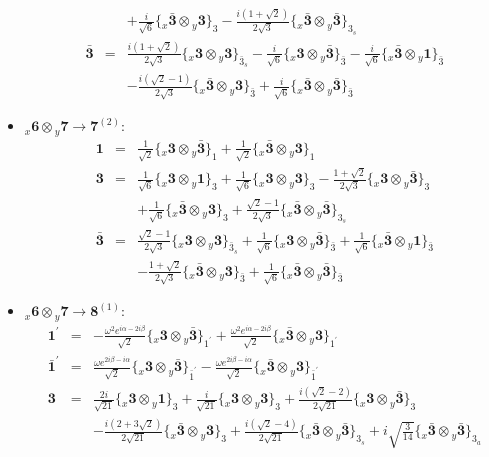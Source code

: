 \documentclass[english]{article}
\newcommand{\rep}[1]{\mathbf{#1}}
\newcommand{\repx}[2]{{}_{#2}\mathbf{#1}}
\newcommand{\subcg}[3]{\big\{ \repx{#1}{x}\otimes\repx{#2}{y}\big\}^{}_{#3}}
\begin{document}
\begin{itemize}
\begin{eqnarray*}
 & & +\frac{i}{\sqrt{6}}\subcg{\bar{3}}{3}{3}-\frac{i \left(1+\sqrt{2}\right)}{2 \sqrt{3}}\subcg{\bar{3}}{\bar{3}}{3_{s}}
\\
\rep{\bar{3}} &=& \frac{i \left(1+\sqrt{2}\right)}{2 \sqrt{3}}\subcg{3}{3}{\bar{3}_{s}}-\frac{i}{\sqrt{6}}\subcg{3}{\bar{3}}{\bar{3}}-\frac{i}{\sqrt{6}}\subcg{\bar{3}}{1}{\bar{3}} \\ 
 & & -\frac{i \left(\sqrt{2}-1\right)}{2 \sqrt{3}}\subcg{\bar{3}}{3}{\bar{3}}+\frac{i}{\sqrt{6}}\subcg{\bar{3}}{\bar{3}}{\bar{3}}
\end{eqnarray*}
\item $\repx{6}{x}\otimes\repx{7}{y}\to\rep{7}^{(2)}$:
\begin{eqnarray*}
\rep{1} &=& \frac{1}{\sqrt{2}}\subcg{3}{\bar{3}}{1}+\frac{1}{\sqrt{2}}\subcg{\bar{3}}{3}{1}
\\
\rep{3} &=& \frac{1}{\sqrt{6}}\subcg{3}{1}{3}+\frac{1}{\sqrt{6}}\subcg{3}{3}{3}-\frac{1+\sqrt{2}}{2 \sqrt{3}}\subcg{3}{\bar{3}}{3} \\ 
 & & +\frac{1}{\sqrt{6}}\subcg{\bar{3}}{3}{3}+\frac{\sqrt{2}-1}{2 \sqrt{3}}\subcg{\bar{3}}{\bar{3}}{3_{s}}
\\
\rep{\bar{3}} &=& \frac{\sqrt{2}-1}{2 \sqrt{3}}\subcg{3}{3}{\bar{3}_{s}}+\frac{1}{\sqrt{6}}\subcg{3}{\bar{3}}{\bar{3}}+\frac{1}{\sqrt{6}}\subcg{\bar{3}}{1}{\bar{3}} \\ 
 & & -\frac{1+\sqrt{2}}{2 \sqrt{3}}\subcg{\bar{3}}{3}{\bar{3}}+\frac{1}{\sqrt{6}}\subcg{\bar{3}}{\bar{3}}{\bar{3}}
\end{eqnarray*}
\item $\repx{6}{x}\otimes\repx{7}{y}\to\rep{8}^{(1)}$:
\begin{eqnarray*}
\rep{1^{\prime}} &=& -\frac{\omega ^2 e^{i \alpha -2 i \beta }}{\sqrt{2}}\subcg{3}{\bar{3}}{1^{\prime}}+\frac{\omega ^2 e^{i \alpha -2 i \beta }}{\sqrt{2}}\subcg{\bar{3}}{3}{1^{\prime}}
\\
\rep{\bar{1}^{\prime}} &=& \frac{\omega  e^{2 i \beta -i \alpha }}{\sqrt{2}}\subcg{3}{\bar{3}}{\bar{1}^{\prime}}-\frac{\omega  e^{2 i \beta -i \alpha }}{\sqrt{2}}\subcg{\bar{3}}{3}{\bar{1}^{\prime}}
\\
\rep{3} &=& \frac{2 i}{\sqrt{21}}\subcg{3}{1}{3}+\frac{i}{\sqrt{21}}\subcg{3}{3}{3}+\frac{i \left(\sqrt{2}-2\right)}{2 \sqrt{21}}\subcg{3}{\bar{3}}{3} \\ 
 & & -\frac{i \left(2+3 \sqrt{2}\right)}{2 \sqrt{21}}\subcg{\bar{3}}{3}{3}+\frac{i \left(\sqrt{2}-4\right)}{2 \sqrt{21}}\subcg{\bar{3}}{\bar{3}}{3_{s}}+i \sqrt{\frac{3}{14}}\subcg{\bar{3}}{\bar{3}}{3_{a}}
\\

\end{eqnarray*}
\end{itemize}
\end{document}
